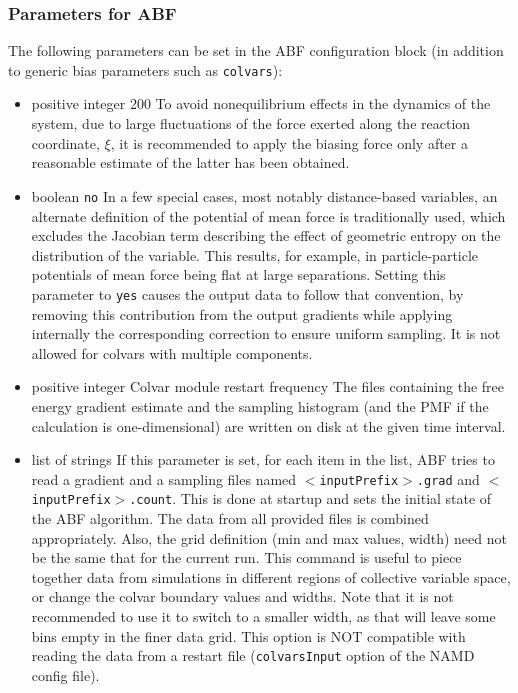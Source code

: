 \subsubsection*{Parameters for ABF}

The following parameters can be set in the ABF configuration block
(in addition to generic bias parameters such as \texttt{colvars}):

\begin{itemize}
\item {}
  {positive integer}
  {200}
  {To avoid nonequilibrium effects in the dynamics of the system, due to large
    fluctuations of the force exerted along the reaction coordinate, $\xi$, it
    is recommended to apply the biasing force only after a reasonable estimate
    of the latter has been obtained.}

\item {}
  {boolean}
  {\texttt{no}}
  {In a few special cases, most notably distance-based variables, an alternate definition of
    the potential of mean force is traditionally used, which excludes the Jacobian
    term describing the effect of geometric entropy on the distribution of the variable.
    This results, for example, in particle-particle potentials of mean force being flat
    at large separations.
    Setting this parameter to \texttt{yes} causes the output data to follow that convention,
    by removing this contribution from the output gradients while
    applying internally the corresponding correction to ensure uniform sampling.
    It is not allowed for colvars with multiple components.}

\item {}
  {positive integer}
  {Colvar module restart frequency}
  {The files containing the free energy gradient estimate and the sampling histogram
    (and the PMF if the calculation is one-dimensional) are written on disk at the given
    time interval.}

\item {}
  {list of strings}
  {If this parameter is set, for each item in the list, ABF tries to read
    a gradient and a sampling files named \texttt{$<$inputPrefix$>$.grad}
    and \texttt{$<$inputPrefix$>$.count}. This is done at
    startup and sets the initial state of the ABF algorithm.
    The data from all provided files is combined appropriately.
    Also, the grid definition (min and max values, width) need not be the same
    that for the current run. This command is useful to piece together
    data from simulations in different regions of collective variable space,
    or change the colvar boundary values and widths. Note that it is not
    recommended to use it to switch to a smaller width, as that will leave
    some bins empty in the finer data grid.
    This option is NOT compatible with reading the data from a restart file
    (\texttt{colvarsInput} option of the NAMD config file).}


\end{itemize}
